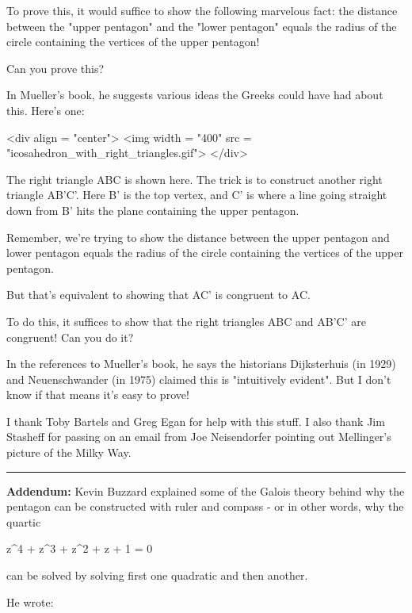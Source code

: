 To prove this, it would suffice to show the following marvelous fact:
the distance between the "upper pentagon" and the
"lower pentagon" equals the radius of the circle containing
the vertices of the upper pentagon!

Can you prove this?

In Mueller's book, he suggests various ideas the Greeks could
have had about this.  Here's one:

<div align = "center">
<img width = "400" src = "icosahedron_with_right_triangles.gif">
</div>

The right triangle ABC is shown here.  The trick is to construct
another right triangle AB'C'.  Here B' is the top vertex, and C'
is where a line going straight down from B' hits the plane
containing the upper pentagon.

Remember, we're trying to show the distance 
between the upper pentagon and lower pentagon 
equals the radius of the circle containing the
vertices of the upper pentagon.

But that's equivalent to showing that AC' is congruent to AC.

To do this, it suffices to show that the right triangles ABC
and AB'C' are congruent!  Can you do it?

In the references to Mueller's book, he says the historians
Dijksterhuis (in 1929) and Neuenschwander (in 1975) claimed this
is "intuitively evident".  But I don't know if that means
it's easy to prove!

I thank Toby Bartels and Greg Egan for help with this stuff.
I also thank Jim Stasheff for passing on an email from Joe
Neisendorfer pointing out Mellinger's picture of the Milky Way.

\par\noindent\rule{\textwidth}{0.4pt}

\textbf{Addendum:} Kevin Buzzard explained some of the Galois theory
behind why the pentagon can be constructed with ruler and compass -
or in other words, why the quartic 

z^{4} + z^{3} + z^{2} + z + 1 = 0

can be solved by solving first one quadratic and then another.

He wrote:

